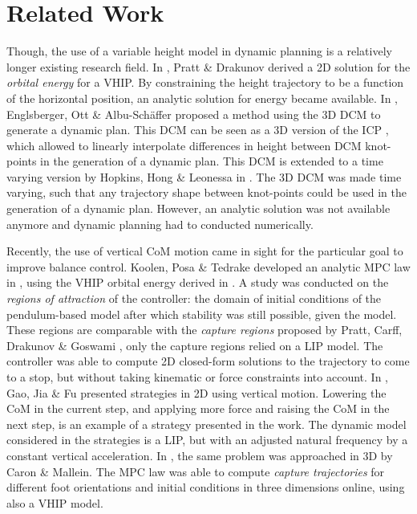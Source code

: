 \section{Related Work}
Though, the use of a variable height model in dynamic planning is a relatively longer existing research field. In \cite{pratt2007derivation}, Pratt \& Drakunov derived a \ac{2D} solution for the \textit{orbital energy} for a \ac{VHIP}. By constraining the height trajectory to be a function of the horizontal position, an analytic solution for energy became available. In \cite{englsberger2013three}, Englsberger, Ott \& Albu-Sch{\"a}ffer proposed a method using the \ac{3D} \ac{DCM} to generate a dynamic plan. This \ac{DCM} can be seen as a \ac{3D} version of the \ac{ICP} \cite{koolen2012capturability}, which allowed to linearly interpolate differences in height between \ac{DCM} knot-points in the generation of a dynamic plan.  This \ac{DCM} is extended to a time varying version by Hopkins, Hong \& Leonessa in \cite{hopkins2014humanoid}. The \ac{3D} \ac{DCM} was made time varying, such that any trajectory shape between knot-points could be used in the generation of a dynamic plan. However, an analytic solution was not available anymore and dynamic planning had to conducted numerically. 

Recently, the use of vertical \ac{CoM} motion came in sight for the particular goal to improve balance control. Koolen, Posa \& Tedrake developed an analytic \ac{MPC} law in \cite{koolen2016balance}, using the \ac{VHIP} orbital energy derived in \cite{pratt2007derivation}. A study was conducted on the \textit{regions of attraction} of the controller: the domain of initial conditions of the pendulum-based model after which stability was still possible, given the model. These regions are comparable with the \textit{capture regions} proposed by Pratt, Carff, Drakunov \& Goswami \cite{pratt2006capture}, only the capture regions relied on a \ac{LIP} model. The controller was able to compute \ac{2D} closed-form solutions to the trajectory to come to a stop, but without taking kinematic or force constraints into account. In \cite{gao2017increase}, Gao, Jia \& Fu presented strategies in \ac{2D} using vertical motion. Lowering the \ac{CoM} in the current step, and applying more force and raising the \ac{CoM} in the next step, is an example of a strategy presented in the work. The dynamic model considered in the strategies is a \ac{LIP}, but with an adjusted natural frequency by a constant vertical acceleration. In \cite{caron2018balance}, the same problem was approached in \ac{3D} by Caron \& Mallein. The \ac{MPC} law was able to compute \textit{capture trajectories} for different foot orientations and initial conditions in three dimensions online, using also a \ac{VHIP} model.

